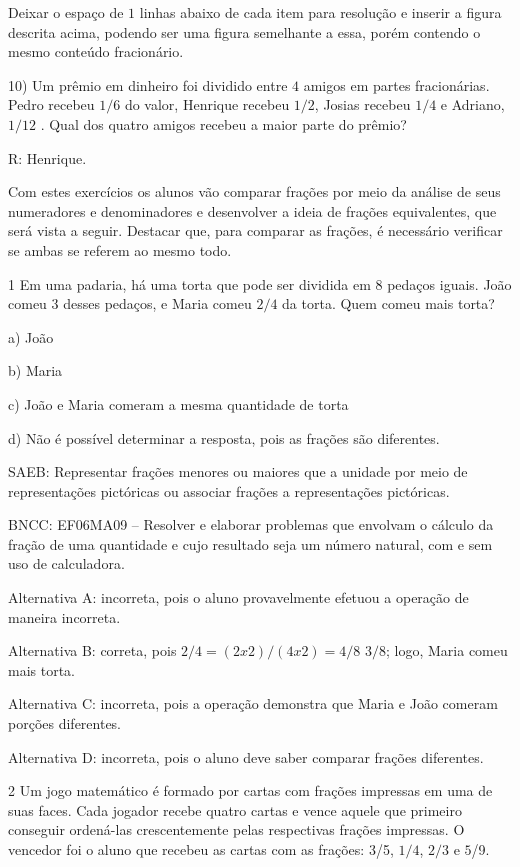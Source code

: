 Deixar o espaço de $1$ linhas abaixo de cada item para resolução e inserir
a figura descrita acima, podendo ser uma figura semelhante a essa, porém
contendo o mesmo conteúdo fracionário.

10) Um prêmio em dinheiro foi dividido entre $4$ amigos em partes
fracionárias. Pedro recebeu $1/6$ do valor, Henrique recebeu $1/2$, Josias
recebeu $1/4$ e Adriano, $1/12$ . Qual dos quatro amigos recebeu a maior
parte do prêmio?

R: Henrique.

Com estes exercícios os alunos vão comparar frações por meio da análise
de seus numeradores e denominadores e desenvolver a ideia de frações
equivalentes, que será vista a seguir. Destacar que, para comparar as
frações, é necessário verificar se ambas se referem ao mesmo todo.


\num{1}  Em uma padaria, há uma torta que pode ser dividida em $8$ pedaços
iguais. João comeu $3$ desses pedaços, e Maria comeu $2/4$ da torta. Quem
comeu mais torta?

a) João

b) Maria

c) João e Maria comeram a mesma quantidade de torta

d) Não é possível determinar a resposta, pois as frações são diferentes.

SAEB: Representar frações menores ou maiores que a unidade por meio de
representações pictóricas ou associar frações a representações
pictóricas.

BNCC: EF06MA09 -- Resolver e elaborar problemas que envolvam o cálculo
da fração de uma quantidade e cujo resultado seja um número natural, com
e sem uso de calculadora.

Alternativa A: incorreta, pois o aluno provavelmente efetuou a operação
de maneira incorreta.


Alternativa B: correta, pois $2/4 = (2 x 2) / (4 x 2) = 4/8$
$3/8$; logo, Maria comeu mais torta.

Alternativa C: incorreta, pois a operação demonstra que Maria e João
comeram porções diferentes.

Alternativa D: incorreta, pois o aluno deve saber comparar frações
diferentes.

\num{2}  Um jogo matemático é formado por cartas com frações impressas em uma
de suas faces. Cada jogador recebe quatro cartas e vence aquele que
primeiro conseguir ordená-las crescentemente pelas respectivas frações
impressas. O vencedor foi o aluno que recebeu as cartas com as frações:
3/5, $1/4$, $2/3$ e $5$/9.

